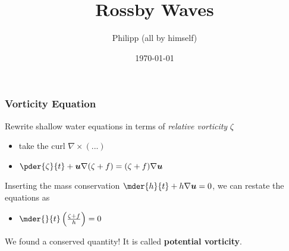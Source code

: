 \documentclass[12pt]{beamer}
\title{Rossby Waves}
\author{Philipp (all by himself)}
\institute{MPE}
\date{\today}
\begin{document}
 
\frame{\titlepage}
 
\begin{frame}
\frametitle{Vorticity Equation}
Rewrite  shallow water equations in terms of \textit{relative vorticity} $\zeta$
\vspace{0.5cm}
\begin{itemize}
\item take the curl $\nabla \times \left(...\right)$
\item $\pder{\zeta}{t}+\bm{u}\nabla(\zeta+f)=(\zeta+f)\nabla \bm{u}$
\end{itemize}
\vspace{0.5cm}
Inserting the mass conservation $\mder{h}{t}+h\nabla\bm{u}=0$, we can restate the equations as 
\vspace{0.5cm}
\begin{itemize}
\item $\mder{}{t}\left(\frac{\zeta+f}{h}\right)=0$
\end{itemize}
\vspace{0.5cm}
We found a conserved quantity! It is called \textbf{potential vorticity}. 
\end{frame}
\end{document}
